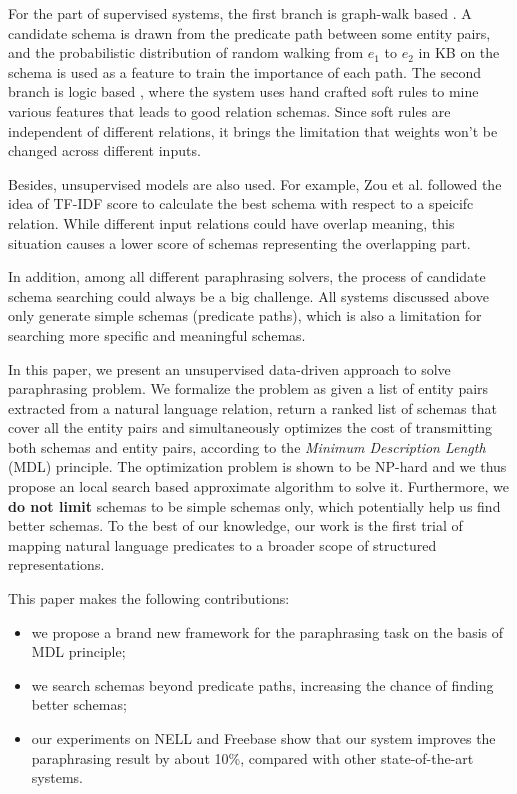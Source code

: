 For the part of supervised systems, the first branch is graph-walk based 
\cite{lao2010relational,lao2011random}. A candidate schema is drawn from the predicate path 
between some entity pairs, and the probabilistic distribution of random walking from $e_1$ 
to $e_2$ in KB on the schema is used as a feature to train the importance of each path.
The second branch is logic based \cite{zhang2012ontological}, where the system uses hand 
crafted soft rules to mine various features that leads to good relation schemas. 
Since soft rules are independent of different relations, it brings the limitation that
weights won't be changed across different inputs.

Besides, unsupervised models are also used. For example, Zou et al. 
followed the idea of TF-IDF score \cite{} to calculate the best schema with respect to a
speicifc relation. While different input relations could have overlap meaning, this situation 
causes a lower score of schemas representing the overlapping part.

In addition, among all different paraphrasing solvers, the process of candidate schema 
searching could always be a big challenge. All systems discussed above only generate
simple schemas (predicate paths), which is also a limitation for searching more
specific and meaningful schemas.

In this paper, we present an unsupervised data-driven approach to solve paraphrasing problem.
We formalize the problem as given a list of entity pairs extracted from a natural language relation,
return a ranked list of schemas that cover all the entity pairs and simultaneously optimizes
the cost of transmitting both schemas and entity pairs, according to the \textit{Minimum
Description Length} (MDL) principle. 
The optimization problem is shown to be NP-hard and we thus propose an local search
based approximate algorithm to solve it.
Furthermore, we \textbf{do not limit} schemas to be simple schemas only, which potentially help
us find better schemas. To the best of our knowledge, our work is the first trial of
mapping natural language predicates to a broader scope of structured representations.


This paper makes the following contributions:
\begin{itemize}
	\item we propose a brand new framework for the paraphrasing task on the basis of MDL principle;
	\item we search schemas beyond predicate paths, increasing the chance of finding better schemas;
	\item our experiments on NELL and Freebase show that our system improves the paraphrasing
		  result by about 10\%, compared with other state-of-the-art systems.
\end{itemize}



